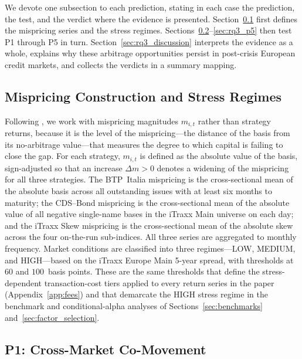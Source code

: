 We devote one subsection to each prediction, stating in each case the
prediction, the test, and the verdict where the evidence is presented.
Section~\ref{sec:rq3_construction} first defines the mispricing series
and the stress regimes. Sections~\ref{sec:rq3_p1}--\ref{sec:rq3_p5}
then test P1 through P5 in turn. Section~\ref{sec:rq3_discussion}
interprets the evidence as a whole, explains why these arbitrage
opportunities persist in post-crisis European credit markets, and
collects the verdicts in a summary mapping.



\subsection{Mispricing Construction and Stress Regimes}
\label{sec:rq3_construction}

Following \citet{duffie2010presidential}, we work with mispricing
magnitudes $m_{i,t}$ rather than strategy returns, because it is the
level of the mispricing---the distance of the basis from its
no-arbitrage value---that measures the degree to which capital is
failing to close the gap. For each strategy, $m_{i,t}$ is defined as
the absolute value of the basis, sign-adjusted so that an increase
$\Delta m > 0$ denotes a widening of the mispricing for all three
strategies. The BTP~Italia mispricing is the cross-sectional mean of the absolute
basis across all outstanding issues with at least six months to
maturity; the CDS--Bond mispricing is the cross-sectional mean of the
absolute value of all negative single-name bases in the iTraxx Main
universe on each day; and the iTraxx Skew mispricing is the
cross-sectional mean of the absolute skew across the four on-the-run
sub-indices. All three series are aggregated to monthly frequency.
Market conditions are classified into three regimes---LOW, MEDIUM, and
HIGH---based on the iTraxx Europe Main 5-year spread, with thresholds
at $60$ and $100$~basis points. These are the same thresholds that
define the stress-dependent transaction-cost tiers applied to every
return series in the paper (Appendix~\ref{app:fees}) and that demarcate
the HIGH stress regime in the benchmark and conditional-alpha analyses
of Sections~\ref{sec:benchmarks} and~\ref{sec:factor_selection}.



\subsection{P1: Cross-Market Co-Movement}
\label{sec:rq3_p1}

